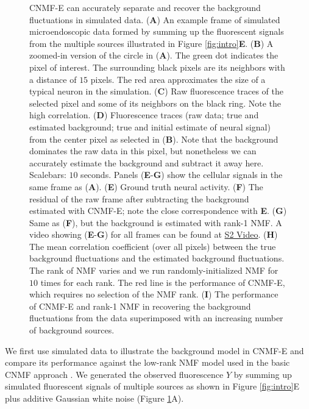 \documentclass[9pt,lineno]{elife}
\begin{document}
\begin{figure}[!t]
  \caption{CNMF-E can accurately separate and recover the background fluctuations in simulated data. (\textbf{A}) An example frame of simulated microendoscopic data formed by summing up the fluorescent signals from the multiple sources illustrated in Figure \ref{fig:intro}\textbf{E}. (\textbf{B}) A zoomed-in version of the circle in (\textbf{A}). The green dot indicates the pixel of interest. The surrounding black pixels are its neighbors with a distance of $15$ pixels. The red area approximates the size of a typical neuron in the simulation.  (\textbf{C}) Raw fluorescence traces of the selected pixel and some of its neighbors on the black ring.  Note the high correlation. (\textbf{D}) Fluorescence traces (raw data; true and estimated background; true and initial estimate of neural signal) from the center pixel as selected in (\textbf{B}). Note that the background dominates the raw data in this pixel, but nonetheless we can accurately estimate the background and subtract it away here.  Scalebars: $10$ seconds.  Panels (\textbf{E}-\textbf{G}) show the cellular signals in the same frame as (\textbf{A}). (\textbf{E}) Ground truth neural activity. (\textbf{F}) The residual of the raw frame after subtracting the background estimated with CNMF-E; note the close correspondence with \textbf{E}. (\textbf{G}) Same as (\textbf{F}), but the background is estimated with rank-1 NMF. A video showing (\textbf{E}-\textbf{G}) for all frames can be found at  \href{http://www.columbia.edu/~pz2230/videos/background_comparison.mp4}{S2 Video}. (\textbf{H}) The mean correlation coefficient (over all pixels) between the true background fluctuations and the estimated background fluctuations. The rank of NMF varies and we run randomly-initialized NMF for $10$ times for each rank. The red line is the performance of CNMF-E, which requires no selection of the NMF rank. (\textbf{I}) The performance of CNMF-E and rank-1 NMF in recovering the background fluctuations from the data superimposed with an increasing number of background sources.}
  \label{fig:bg}
\end{figure}%

We first use simulated data to illustrate the background model in CNMF-E and compare its performance against the low-rank NMF model used in the basic CNMF approach \citep{Pnevmatikakis2016}. 
We generated the observed fluorescence $Y$ by summing up simulated fluorescent signals of multiple sources as shown in Figure \ref{fig:intro}E plus additive Gaussian white noise (Figure \ref{fig:bg}A). 
\end{document}
